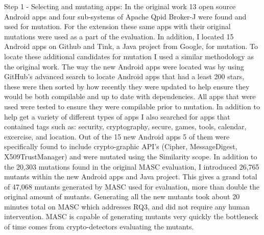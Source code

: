 Step 1 - Selecting and mutating apps: In the original work 13 open source Android apps and four sub-systems of Apache Qpid Broker-J were found and used for mutation. For the extension these same apps with their original mutations were used as a part of the evaluation. In addition, I located 15 Android apps on Github and Tink, a Java project from Google, for mutation. To locate these additional candidates for mutation I used a similar methodology as the original work. The way the new Android apps were located was by using GitHub's advanced search to locate Android apps that had a least 200 stars, these were then sorted by how recently they were updated to help ensure they would be both compilable and up to date with dependencies. All apps that were used were tested to ensure they were compilable prior to mutation. In addition to help get a variety of different types of apps I also searched for apps that contained tags such as: security, cryptography, secure, games, tools, calendar, excercise, and location. Out of the 15 new Android apps 5 of them were specifically found to include crypto-graphic API's (Cipher, MessageDigest, X509TrustManager) and were mutated using the Similarity scope. In addition to the 20,303 mutations found in the original MASC evaluation, I introduced 26,765 mutants within the new Android apps and Java project. This gives a grand total of 47,068 mutants generated by MASC used for evaluation, more than double the original amount of mutants. Generating all the new mutants took about 20 minutes total on MASC which addresses RQ3, and did not require any human intervention. MASC is capable of generating mutants very quickly the bottleneck of time comes from crypto-detectors evaluating the mutants.

